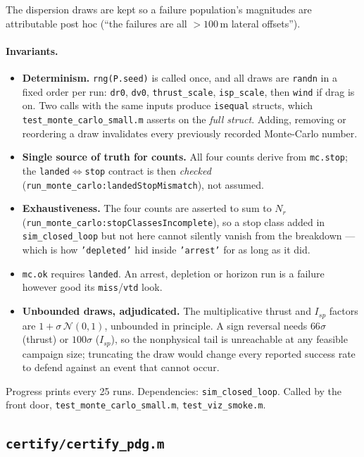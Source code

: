 \documentclass[11pt]{article}
\newcommand{\file}[1]{\texttt{#1}}
\begin{document}
The dispersion draws are kept so a failure population's magnitudes are
attributable post hoc (``the failures are all $>100$\,m lateral offsets'').

\paragraph{Invariants.}
\begin{itemize}
\item \textbf{Determinism.} \texttt{rng(P.seed)} is called once, and all
draws are \texttt{randn} in a fixed order per run:
\texttt{dr0}, \texttt{dv0}, \texttt{thrust\_scale}, \texttt{isp\_scale},
then \texttt{wind} if drag is on. Two calls with the same inputs produce
\texttt{isequal} structs, which \file{test\_monte\_carlo\_small.m} asserts
on the \emph{full struct}. Adding, removing or reordering a draw
invalidates every previously recorded Monte-Carlo number.
\item \textbf{Single source of truth for counts.} All four counts derive
from \texttt{mc.stop}; the \texttt{landed}$\Leftrightarrow$\texttt{stop}
contract is then \emph{checked}
(\texttt{run\_monte\_carlo:landedStopMismatch}), not assumed.
\item \textbf{Exhaustiveness.} The four counts are asserted to sum to
$N_r$ (\texttt{run\_monte\_carlo:stopClassesIncomplete}), so a stop class
added in \texttt{sim\_closed\_loop} but not here cannot silently vanish
from the breakdown --- which is how \texttt{'depleted'} hid inside
\texttt{'arrest'} for as long as it did.
\item \texttt{mc.ok} requires \texttt{landed}. An arrest, depletion or
horizon run is a failure however good its \texttt{miss}/\texttt{vtd} look.
\item \textbf{Unbounded draws, adjudicated.} The multiplicative thrust and
$I_{sp}$ factors are $1 + \sigma\,\mathcal{N}(0,1)$, unbounded in
principle. A sign reversal needs $66\sigma$ (thrust) or $100\sigma$
($I_{sp}$), so the nonphysical tail is unreachable at any feasible campaign
size; truncating the draw would change every reported success rate to
defend against an event that cannot occur.
\end{itemize}

Progress prints every 25 runs. Dependencies: \texttt{sim\_closed\_loop}.
Called by the front door, \file{test\_monte\_carlo\_small.m},
\file{test\_viz\_smoke.m}.

\subsection{\texttt{certify/certify\_pdg.m}}
\label{sec:mod:certify}
\end{document}
